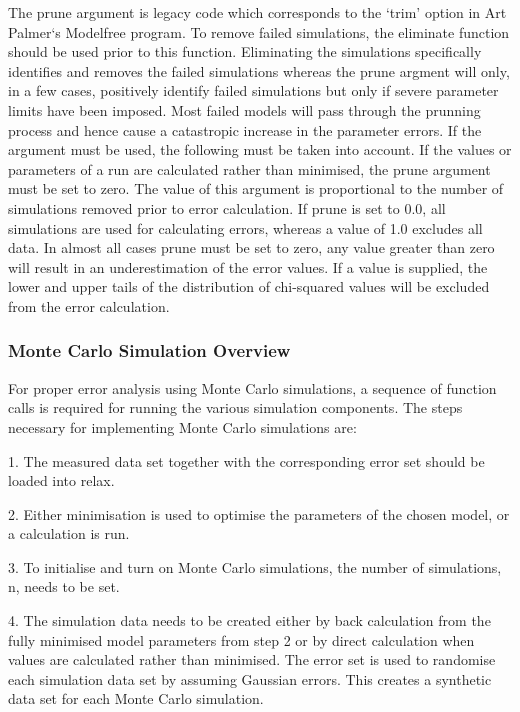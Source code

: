 The prune argument is legacy code which corresponds to the `trim' option in Art Palmer`s
Modelfree program.  To remove failed simulations, the eliminate function should be used
prior to this function.  Eliminating the simulations specifically identifies and removes the
failed simulations whereas the prune argment will only, in a few cases, positively identify
failed simulations but only if severe parameter limits have been imposed.  Most failed
models will pass through the prunning process and hence cause a catastropic increase in the
parameter errors.  If the argument must be used, the following must be taken into account.
If the values or parameters of a run are calculated rather than minimised, the prune
argument must be set to zero.  The value of this argument is proportional to the number of
simulations removed prior to error calculation.  If prune is set to 0.0, all simulations are
used for calculating errors, whereas a value of 1.0 excludes all data.  In almost all cases
prune must be set to zero, any value greater than zero will result in an underestimation of
the error values.  If a value is supplied, the lower and upper tails of the distribution of
chi-squared values will be excluded from the error calculation.



\subsubsection{Monte Carlo Simulation Overview}

For proper error analysis using Monte Carlo simulations, a sequence of function calls is
required for running the various simulation components.  The steps necessary for
implementing Monte Carlo simulations are:

1.  The measured data set together with the corresponding error set should be loaded into
relax.

2.  Either minimisation is used to optimise the parameters of the chosen model, or a
calculation is run.

3.  To initialise and turn on Monte Carlo simulations, the number of simulations, n, needs
to be set.

4.  The simulation data needs to be created either by back calculation from the fully
minimised model parameters from step 2 or by direct calculation when values are calculated
rather than minimised.  The error set is used to randomise each simulation data set by
assuming Gaussian errors.  This creates a synthetic data set for each Monte Carlo
simulation.

